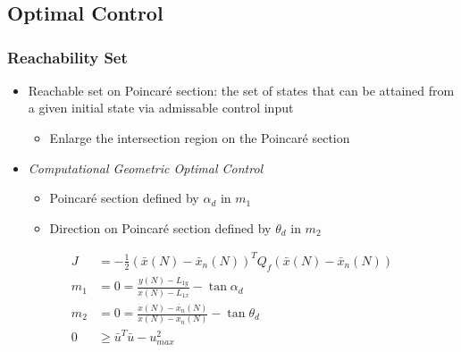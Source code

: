 \section*{}
\subsection*{Optimal Control}
\begin{frame} %
\frametitle{Reachability Set}
  \begin{itemize}
  \item Reachable set on Poincar\'e section: the set of states that can be attained from a given initial state via admissable control input
  		\begin{itemize}
  			\item Enlarge the intersection region on the Poincar\'e section
  		\end{itemize}
  \item \emph{Computational Geometric Optimal Control}
	\begin{itemize}
  		\item Poincar\'e section defined by \( \alpha_d \) in \( m_1\)
		\item Direction on Poincar\'e section defined by \( \theta_d \) in \( m_2 \)
	\end{itemize}
 \end{itemize}
  \begin{align*}
	J &= -\frac{1}{2} \left( \bar{x}(N) - \bar{x}_{n}(N)\right)^T Q_f\left( \bar{x}(N) - \bar{x}_{n}(N)\right)\\
	m_1 &= 0 = \frac{y(N) - L_{1y}}{x(N) - L_{1x}} - \tan{\alpha_d} \\ 
    m_2&= 0 = \frac{\dot{x}(N) - \dot{x_n}(N) }{x(N) -x_n(N) } - \tan{\theta_d} \\
	 0 &\geq\bar{u}^T \bar{u} - u_{max}^2 
	\end{align*}

\end{frame}   %

